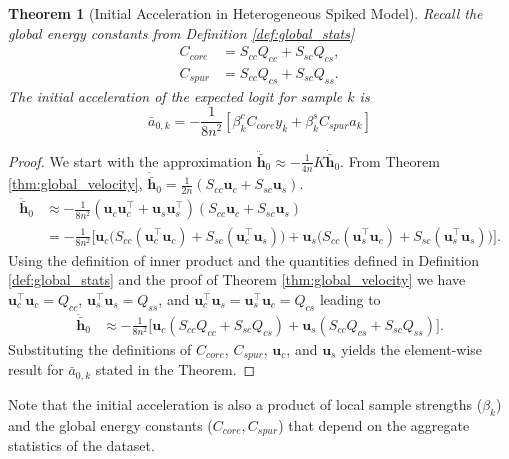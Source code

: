\documentclass[letter,11pt]{article}
\newtheorem{theorem}{Theorem}
\begin{document}
\begin{theorem}[Initial Acceleration in Heterogeneous Spiked Model]\label{thm:global_acceleration}
    Recall the global energy constants from Definition \ref{def:global_stats}
    \begin{equation}
    \begin{aligned}
    C_{core} &= S_{cc} Q_{cc} + S_{sc} Q_{cs}, \\
    C_{spur} &= S_{cc} Q_{cs} + S_{sc} Q_{ss}.
    \end{aligned}
    \end{equation}
    The initial acceleration of the expected logit for sample $k$ is
    \begin{equation}
        \bar{a}_{0,k} = -\frac{1}{8n^2} \left[ \beta^c_k C_{core} y_k + \beta^s_k C_{spur} a_k \right]
    \end{equation}
\end{theorem}
\begin{proof}
    We start with the approximation $\ddot{\bar{\mathbf{h}}}_0 \approx -\frac{1}{4n} K \dot{\bar{\mathbf{h}}}_0$. From Theorem \ref{thm:global_velocity}, $\dot{\bar{\mathbf{h}}}_0 = \frac{1}{2n} (S_{cc} \mathbf{u}_c + S_{sc} \mathbf{u}_s)$.
    \begin{align*}
    \ddot{\bar{\mathbf{h}}}_0
    &\approx -\frac{1}{8n^2} (\mathbf{u}_c \mathbf{u}_c^\top + \mathbf{u}_s \mathbf{u}_s^\top)
        (S_{cc} \mathbf{u}_c + S_{sc} \mathbf{u}_s) \\
    &= -\frac{1}{8n^2} \Big[
        \mathbf{u}_c \big( S_{cc} (\mathbf{u}_c^\top \mathbf{u}_c)
                         + S_{sc} (\mathbf{u}_c^\top \mathbf{u}_s) \big)
      + \mathbf{u}_s \big( S_{cc} (\mathbf{u}_s^\top \mathbf{u}_c)
                         + S_{sc} (\mathbf{u}_s^\top \mathbf{u}_s) \big)
    \Big].
    \end{align*}
    Using the definition of inner product and the quantities defined in Definition \ref{def:global_stats} and the proof of Theorem \ref{thm:global_velocity} we have $\mathbf{u}_c^\top \mathbf{u}_c = Q_{cc}$, $\mathbf{u}_s^\top \mathbf{u}_s = Q_{ss}$, and $\mathbf{u}_c^\top \mathbf{u}_s = \mathbf{u}_s^\top \mathbf{u}_c = Q_{cs}$ leading to
    \begin{align}
    \ddot{\bar{\mathbf{h}}}_0
    &\approx -\frac{1}{8n^2} \Big[
        \mathbf{u}_c (S_{cc} Q_{cc} + S_{sc} Q_{cs})
        + \mathbf{u}_s (S_{cc} Q_{cs} + S_{sc} Q_{ss})
    \Big].
    \end{align}
    Substituting the definitions of $C_{core}$, $C_{spur}$, $\mathbf{u}_c$, and $\mathbf{u}_s$ yields the element-wise result for $\bar{a}_{0,k}$ stated in the Theorem.
\end{proof}
Note that the initial acceleration is also a product of local sample strengths ($\beta_k$) and the global energy constants ($C_{core}, C_{spur}$) that depend on the aggregate statistics of the dataset.
\end{document}
